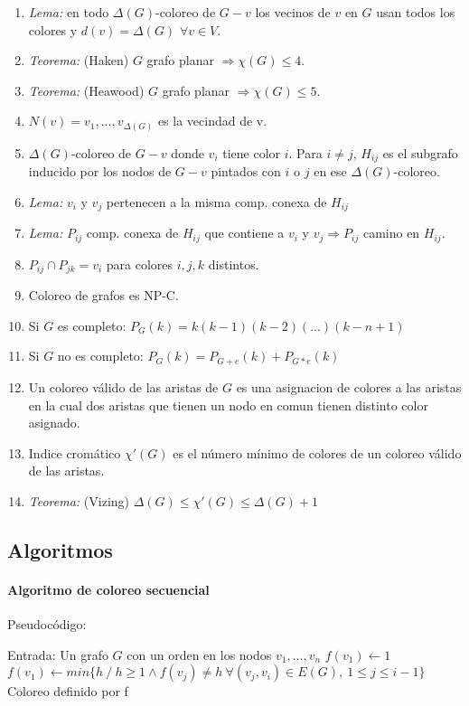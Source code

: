 \begin{enumerate}
\item \textit{Lema:} en todo $\Delta(G)$-coloreo de $G-{v}$ los vecinos de $v$ en $G$ usan todos los colores y $d(v) = \Delta(G)$ $\forall v \in V$.
\item \textit{Teorema:} (Haken) $G$ grafo planar $\Rightarrow \chi(G) \leq 4$.
\item \textit{Teorema:} (Heawood) $G$ grafo planar $\Rightarrow \chi(G) \leq 5$.
\item $N(v)={v_{1},...,v_{\Delta(G)}}$ es la vecindad de v.
\item $\Delta(G)$-coloreo de $G-{v}$ donde $v_{i}$ tiene color $i$. Para $i \neq j$, $H_{ij}$ es el subgrafo inducido por los nodos de $G-{v}$ pintados con $i$ o $j$ en ese $\Delta(G)$-coloreo.
\item \textit{Lema:} $v_{i}$ y $v_{j}$ pertenecen a la misma comp. conexa de $H_{ij}$
\item \textit{Lema:} $P_{ij}$ comp. conexa de $H_{ij}$ que contiene a $v_{i}$ y $v_{j} \Rightarrow P_{ij}$ camino en $H_{ij}$.
\item $P_{ij} \cap P_{jk} = {v_{i}}$ para colores $i,j,k$ distintos.
\item Coloreo de grafos es NP-C.
\item Si $G$ es completo: $P_{G}(k)= k(k-1)(k-2)(...)(k-n+1)$
\item Si $G$ no es completo: $P_{G}(k)= P_{G+e}(k) + P_{G*e}(k)$
\item Un coloreo válido de las aristas de $G$ es una asignacion de colores a las aristas en la cual dos aristas que tienen un nodo en comun tienen distinto color asignado.
\item Indice cromático $\chi'(G)$ es el número mínimo de colores de un coloreo válido de las aristas.
\item \textit{Teorema:} (Vizing) $\Delta(G) \leq \chi'(G) \leq \Delta(G)+1$
\end{enumerate}

\subsection{Algoritmos}
\paragraph{Algoritmo de coloreo secuencial}

Pseudocódigo:
\begin{algorithmic}[1]
    \State Entrada: Un grafo $G$ con un orden en los nodos $v_1, \dots, v_n$
    \State $f(v_1) \gets 1$
        \State $f(v_1) \gets min\{h\ /\ h \geq 1 \land f(v_j) \neq h\ \forall(v_j,v_i) \in E(G),\ 1 \leq j \leq i-1 \}$
    \EndFor
    \State \Return Coloreo definido por f
\end{algorithmic}
